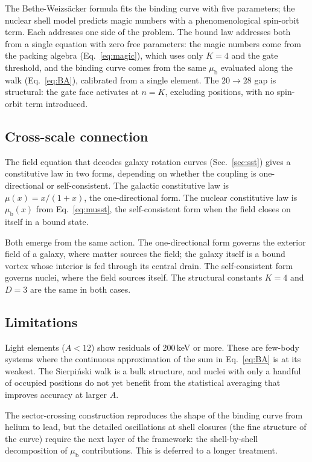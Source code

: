 \documentclass[fleqn,usenatbib]{mnras}
\begin{document}
The Bethe-Weizs\"acker formula fits the binding curve with five parameters; the nuclear shell model predicts magic numbers with a phenomenological spin-orbit term. Each addresses one side of the problem. The bound law addresses both from a single equation with zero free parameters: the magic numbers come from the packing algebra (Eq.~\ref{eq:magic}), which uses only $K = 4$ and the gate threshold, and the binding curve comes from the same $\mu_{\mathrm{b}}$ evaluated along the walk (Eq.~\ref{eq:BA}), calibrated from a single element. The $20\!\to\!28$ gap is structural: the gate face activates at $n = K$, excluding positions, with no spin-orbit term introduced.

\subsection{Cross-scale connection}

The field equation that decodes galaxy rotation curves (Sec.~\ref{sec:sst}) gives a constitutive law in two forms, depending on whether the coupling is one-directional or self-consistent. The galactic constitutive law is $\mu(x) = x/(1+x)$, the one-directional form. The nuclear constitutive law is $\mu_{\mathrm{b}}(x)$ from Eq.~\ref{eq:musst}, the self-consistent form when the field closes on itself in a bound state.

Both emerge from the same action. The one-directional form governs the exterior field of a galaxy, where matter sources the field; the galaxy itself is a bound vortex whose interior is fed through its central drain. The self-consistent form governs nuclei, where the field sources itself. The structural constants $K = 4$ and $D = 3$ are the same in both cases.

\subsection{Limitations}

Light elements ($A < 12$) show residuals of 200\,keV or more. These are few-body systems where the continuous approximation of the sum in Eq.~\ref{eq:BA} is at its weakest. The Sierpi\'nski walk is a bulk structure, and nuclei with only a handful of occupied positions do not yet benefit from the statistical averaging that improves accuracy at larger $A$.

The sector-crossing construction reproduces the shape of the binding curve from helium to lead, but the detailed oscillations at shell closures (the fine structure of the curve) require the next layer of the framework: the shell-by-shell decomposition of $\mu_{\mathrm{b}}$ contributions. This is deferred to a longer treatment.
\end{document}
